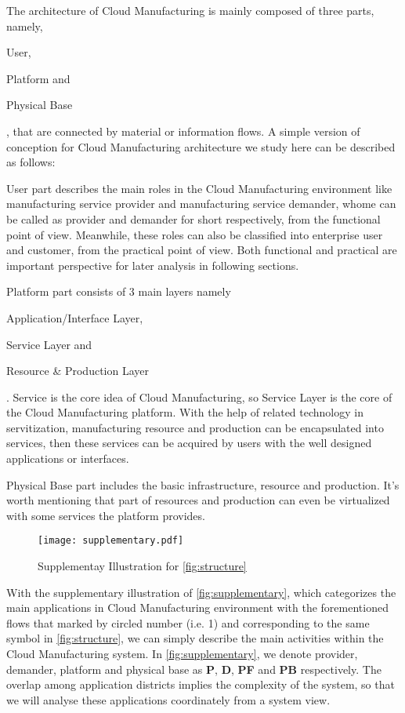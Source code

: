 The architecture of Cloud Manufacturing is mainly composed of three parts, namely, \begin{inparaenum}[1)]
\item User,
\item Platform and
\item Physical Base
\end{inparaenum}, that are connected by material or information flows. A simple version of conception for Cloud Manufacturing architecture we study here can be described as follows:
\begin{compactdesc}
\item [User] part describes the main roles in the Cloud Manufacturing environment like manufacturing service provider and manufacturing service demander, whome can be called as provider and demander for short respectively, from the functional point of view. Meanwhile, these roles can also be classified into enterprise user and customer, from the practical point of view. Both functional and practical are important perspective for later analysis in following sections. 
\item [Platform] part consists of 3 main layers namely \begin{inparaenum}[1)]
\item Application/Interface Layer,
\item Service Layer and 
\item Resource \& Production Layer
\end{inparaenum}.
Service is the core idea of Cloud Manufacturing, so Service Layer is the core of the Cloud Manufacturing platform. With the help of related technology in servitization, manufacturing resource and production can be encapsulated into services, then these services can be acquired by users with the well designed applications or interfaces.
\item [Physical Base] part includes the basic infrastructure, resource and production. It's worth mentioning that part of resources and production can even be virtualized with some services the platform provides.
\end{compactdesc}
 
\begin{figure}[htbp]
\centering
\texttt{[image: supplementary.pdf]}
\caption{Supplementay Illustration for \autoref{fig:structure}}
\label{fig:supplementary}
\end{figure}

With the supplementary illustration of \autoref{fig:supplementary}, which categorizes the main applications in Cloud Manufacturing environment with the forementioned flows that marked by circled number (i.e. \textcircled{\small{1}}) and corresponding to the same symbol in \autoref{fig:structure}, we can simply describe the main activities within the Cloud Manufacturing system. In \autoref{fig:supplementary}, we denote provider, demander, platform and physical base as \textbf{P}, \textbf{D}, \textbf{PF} and \textbf{PB} respectively. The overlap among application districts implies the complexity of the system, so that we will analyse these applications coordinately from a system view.

